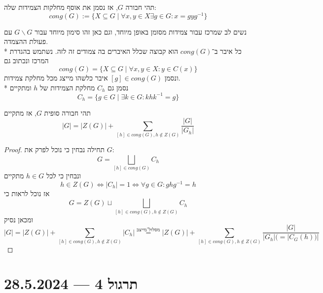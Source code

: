 \begin{notation}
	תהי חבורה $G$, אז נסמן את אוסף מחלקות הצמידות שלה:
	\[
		cong(G) := \{ X \subseteq G \mid \forall x, y \in X \exists g \in G : x = g y g^{-1} \}
	\]
\end{notation}
נשים לב שמרכז עבור צמידות מסומן באופן מיוחד, וגם כאן זהו סימון מיוחד עבור $G \backslash G$ עם פעולת ההצמדה. \\*
כל איבר ב־$cong(G)$ הוא קבוצה שכלל האיברים בה צמודים זה לזה.
נשתמש בהגדרת המרכז ונכתוב גם
\[
	cong(G) = \{ X \subseteq G \mid \forall x, y \in X : y \in C(x) \}
\]
ונסמן $[g] \in cong(G)$ איבר כלשהו מייצג מכל מחלקת צמידות. \\*
נסמן גם $C_h$ מחלקת הצמידות של $h$ ומתקיים
\[
	C_h = \{ g \in G \mid \exists k \in G : k h k^{-1} = g \}
\]

\begin{proposition}
	תהי חבורה סופית $G$, אז מתקיים
	\[
		|G| = |Z(G)| + \sum_{[h] \in cong(G), h \notin Z(G)} \frac{|G|}{|G_h|}
	\]
\end{proposition}
\begin{proof}
	תחילה נבחין כי נוכל לפרק את $G$:
	\[
		G = \bigsqcup_{[h] \in cong(G)} C_h
	\]
	ונבחין כי לכל $h \in G$ מתקיים
	\[
		h \in Z(G)
		\iff
		|C_h| = 1
		\iff
		\forall g \in G : g h g^{-1} = h
	\]
	אז נוכל לראות כי
	\[
		G = Z(G) \sqcup \bigsqcup_{[h] \in cong(G), h \notin Z(G)} C_h
	\]
	ומכאן נסיק
	\[
		|G|
		= |Z(G)| + \sum_{[h] \in cong(G), h \notin Z(G)} |C_h|
		\overset{\text{מסלול־מייצב}}{=} |Z(G)| + \sum_{[h] \in cong(G), h \notin Z(G)} \frac{|G|}{|G_h| (= |C_G(h))|}
	\]
\end{proof}

\section{תרגול 4 --- 28.5.2024}
